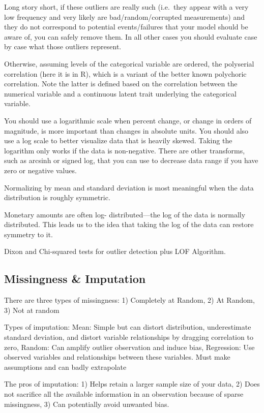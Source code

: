 \documentclass[]{book}
\begin{document}
Long story short, if these outliers are really such (i.e.~they appear with a very low frequency and very likely are bad/random/corrupted measurements) and they do not correspond to potential events/failures that your model should be aware of, you can safely remove them. In all other cases you should evaluate case by case what those outliers represent.

Otherwise, assuming levels of the categorical variable are ordered, the polyserial correlation (here it is in R), which is a variant of the better known polychoric correlation. Note the latter is defined based on the correlation between the numerical variable and a continuous latent trait underlying the categorical variable.

You should use a logarithmic scale when percent change, or change in orders of magnitude, is more important than changes in absolute units. You should also use a log scale to better visualize data that is heavily skewed. Taking the logarithm only works if the data is non-negative. There are other transforms, such as arcsinh or signed log, that you can use to decrease data range if you have zero or negative values.

Normalizing by mean and standard deviation is most meaningful when the data distribution is roughly symmetric.

Monetary amounts are often log- distributed---the log of the data is normally distributed. This leads us to the idea that taking the log of the data can restore symmetry to it.

Dixon and Chi-squared tests for outlier detection plus LOF Algorithm.

\hypertarget{missingness-imputation}{%
\subsection{Missingness \& Imputation}\label{missingness-imputation}}

There are three types of missingness: 1) Completely at Random, 2) At Random, 3) Not at random

Types of imputation: Mean: Simple but can distort distribution, underestimate standard deviation, and distort variable relationships by dragging correlation to zero, Random: Can amplify outlier observation and induce bias, Regression: Use observed variables and relationships between these variables. Must make assumptions and can badly extrapolate

The pros of imputation: 1) Helps retain a larger sample size of your data, 2) Does not sacrifice all the available information in an observation because of sparse missingness, 3) Can potentially avoid unwanted bias.
\end{document}
